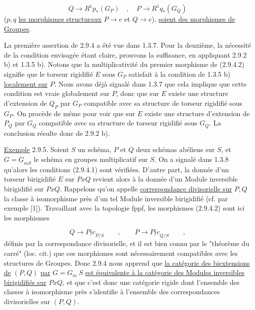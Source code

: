 \begin{equation}\tag{2.9.4.2}
Q \longrightarrow R^1 p_*(G_P) \quad , \quad P \longrightarrow R^1 q_*(G_Q)
\end{equation}
($p,q$ \underline{les morphismes structuraux} $P \to e$ et $Q \to e$), \underline{soient des morphismes de Groupes}.

La première assertion de 2.9.4 a été vue dans 1.3.7. Pour la deuxième, la nécessité de la condition envisagée étant claire, prouvons
la suffisance, en appliquant 2.9.2 b) et 1.3.5 b). Notons que la multiplicativité du premier morphisme de (2.9.4.2) signifie que le torseur rigidifié $E$ sous $G_P$ satisfait à la condition de 1.3.5 b) \underline{localement sur} $P$. Nous avons déjà signalé dans 1.3.7 que cela implique que cette condition est vraie globalement sur $P$, donc que sur $E$ existe une structure d'extension de $Q_P$ par $G_P$ compatible avec sa structure de torseur rigidifié sous $G_P$. On procède de même pour voir que sur $E$ existe une structure d'extension de $P_Q$ par $G_Q$ compatible avec sa structure de torseur rigidifié sous $G_Q$. La conclusion résulte donc de 2.9.2 b).

\underline{Exemple} 2.9.5. Soient $S$ un schéma, $P$ et $Q$ deux schémas abéliens sur $S$, et $G=\underline{G}_{mS}$ le schéma en groupes multiplicatif sur $S$. On a signalé dans 1.3.8 qu'alors les conditions (2.9.4.1) sont vérifiées. D'autre part, la donnée d'un torseur birigidifié $E$ sur $PxQ$ revient alors à la donnée d'un Module inversible birigidifié sur $PxQ$. Rappelons qu'on appelle \underline{correspondance divisorielle sur} $P,Q$ la classe à isomorphisme près d'un tel Module inversible birigidifié (cf. par exemple [1]). Travaillant avec la topologie fppf, les morphismes (2.9.4.2) sont ici les morphismes

\begin{equation}\tag{2.9.5.1}
Q \longrightarrow \underline{Pic}_{P/S} \qquad , \qquad P \longrightarrow \underline{Pic}_{Q/S} \qquad ,
\end{equation}
définis par la correspondance divisorielle, et il est bien connu par le "théorème du carré" (loc. cit.) que ces morphismes sont nécessairement compatibles avec les structures de Groupes. Donc 2.9.4 nous apprend que \underline{la catégorie des biextensions de} $(P,Q)$ \underline{par} $G=G_m\ S$ \underline{est équivalente à la catégorie des Modules inversibles birigidifiés sur} $PxQ$, et que c'est donc une catégorie rigide dont l'ensemble des classes à isomorphisme près s'identifie à l'ensemble des correspondances divisorielles sur $(P,Q)$.


